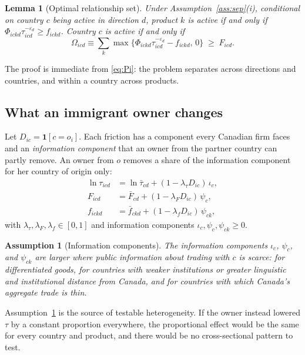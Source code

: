 \documentclass[12pt]{article}
\newtheorem{lemma}{Lemma}
\newtheorem{assumption}{Assumption}
\theoremstyle{remark}
\newcommand{\one}{\mathbf{1}}
\begin{document}
\begin{lemma}[Optimal relationship set]\label{lem:set}
Under Assumption~\ref{ass:sep}(i), conditional on country $c$ being active in
direction $d$, product $k$ is active if and only if
$\Phi_{ickd}\tau_{icd}^{-\varepsilon_d}\geq f_{ickd}$. Country $c$ is active
if and only if
\begin{equation}
\Omega_{icd}\equiv\sum_{k}\max\{\Phi_{ickd}\tau_{icd}^{-\varepsilon_d}-f_{ickd},\,0\}
\;\geq\;F_{icd}.
\label{eq:Omega}
\end{equation}
\end{lemma}

\noindent The proof is immediate from \eqref{eq:Pi}: the problem separates
across directions and countries, and within a country across products.

\subsection{What an immigrant owner changes}

Let $D_{ic}=\one[c=o_i]$. Each friction has a component every Canadian firm
faces and an \emph{information component} that an owner from the partner
country can partly remove. An owner from $o$ removes a share of the
information component for her country of origin only:
\begin{align}
\ln\tau_{icd} &= \ln\bar\tau_{cd} + (1-\lambda_\tau D_{ic})\,\iota_{c},
\label{eq:tau}\\
F_{icd} &= \bar F_{cd} + (1-\lambda_F D_{ic})\,\psi_{c},
\label{eq:F}\\
f_{ickd} &= \bar f_{ckd} + (1-\lambda_f D_{ic})\,\psi_{ck},
\label{eq:f}
\end{align}
with $\lambda_\tau,\lambda_F,\lambda_f\in[0,1]$ and information components
$\iota_c,\psi_c,\psi_{ck}\geq0$.

\begin{assumption}[Information components]\label{ass:info}
The information components $\iota_c$, $\psi_c$, and $\psi_{ck}$ are larger where
public information about trading with $c$ is scarce: for differentiated
goods, for countries with weaker institutions or greater linguistic and
institutional distance from Canada, and for countries with which Canada's
aggregate trade is thin.
\end{assumption}

Assumption~\ref{ass:info} is the source of testable heterogeneity. If the owner
instead lowered $\tau$ by a constant proportion everywhere, the proportional
effect would be the same for every country and product, and there would be no
cross-sectional pattern to test.
\end{document}
